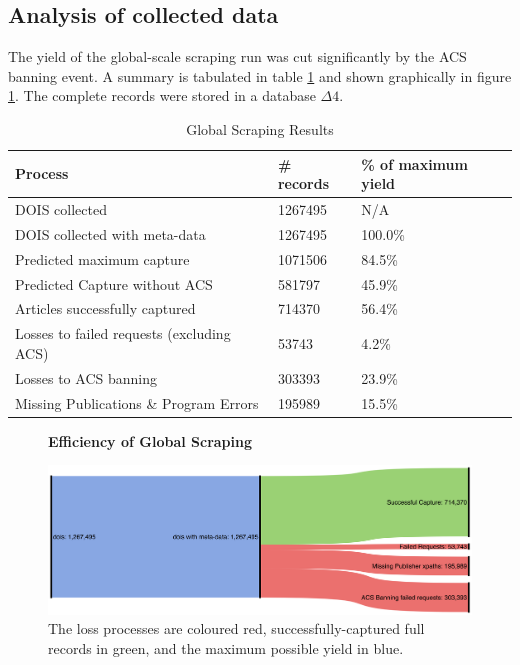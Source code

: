 \subsection{Analysis of collected data}
The yield of the global-scale scraping run was cut significantly by the ACS banning event. A summary is tabulated in table \ref{tab:LARGESCRAPERES} and shown graphically in figure \ref{fig:LARGESANK}. The complete records were stored in a database $\Delta4$.
\begin{table}[h!]
\caption{Global Scraping Results}
\label{tab:LARGESCRAPERES}

\begin{center}
\begin{tabular}{||l|l|l||}
\hline
Process & \# records & \% of maximum yield\\
\hline
DOIS collected &  1267495 &N/A\\
DOIS collected with meta-data &  1267495 &100.0\%\\

\hline
Predicted maximum capture & 1071506 &  84.5\%\\
Predicted Capture without ACS & 581797 & 45.9\%\\
\hline
Articles successfully captured & 714370 & 56.4\%\\
Losses to failed requests (excluding ACS)& 53743 & 4.2\%\\
Losses to ACS banning & 303393 & 23.9\%\\
Missing Publications \& Program Errors & 195989 & 15.5\%\\
\hline
\end{tabular}
\end{center}
\end{table}
\begin{figure}[H]
    \centering
    \textbf{Efficiency of Global Scraping}\par\medskip
    \includegraphics[width=\textwidth]{Data_Acquisition/large_sankey.png}
    \caption[Efficiency of Large Scale Scraping]{The loss processes are coloured red, successfully-captured full records in green, and the maximum possible yield in blue.}
     \label{fig:LARGESANK}
\end{figure}

